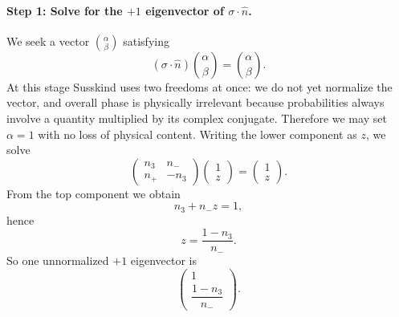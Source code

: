 \paragraph{Step 1: Solve for the \(+1\) eigenvector of \(\sigma\cdot\hat n\).}
We seek a vector \(\binom{\alpha}{\beta}\) satisfying
\begin{equation}
(\sigma\cdot\hat n)\binom{\alpha}{\beta}=\binom{\alpha}{\beta}.
\end{equation}
At this stage Susskind uses two freedoms at once: we do not yet normalize the vector, and overall phase is physically irrelevant because probabilities always involve a quantity multiplied by its complex conjugate. Therefore we may set \(\alpha=1\) with no loss of physical content. Writing the lower component as \(z\), we solve
\begin{equation}
\begin{pmatrix}
n_3 & n_- \\
n_+ & -n_3
\end{pmatrix}
\begin{pmatrix}
1\\
z
\end{pmatrix}
=
\begin{pmatrix}
1\\
z
\end{pmatrix}.
\end{equation}
From the top component we obtain
\begin{equation}
n_3+n_-z=1,
\end{equation}
hence
\begin{equation}
z=\frac{1-n_3}{n_-}.
\end{equation}
So one unnormalized \(+1\) eigenvector is
\begin{equation}
\begin{pmatrix}
1\\[4pt]
\dfrac{1-n_3}{n_-}
\end{pmatrix}.
\end{equation}

